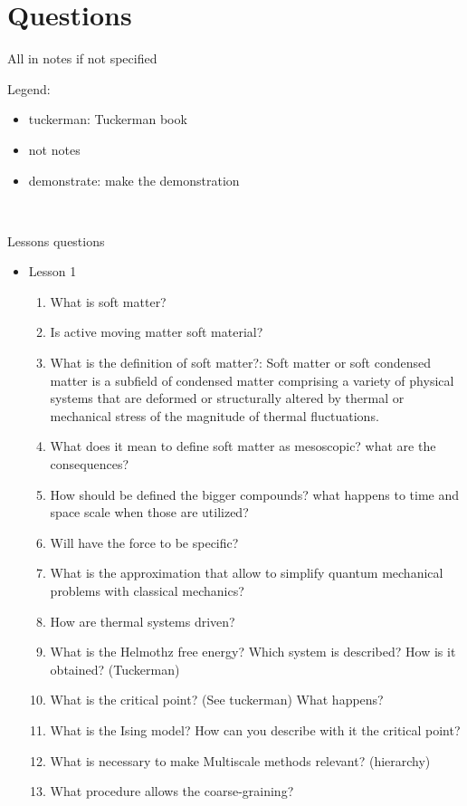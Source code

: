 \chapter{Questions}

All in notes if not specified\\
\small{
Legend:
\begin{itemize}
    \item tuckerman: Tuckerman book
    \item not notes
    \item demonstrate: make the demonstration
\end{itemize}
}
\hfill \\
\small{
Lessons questions
\begin{itemize}
    \item Lesson 1
    \begin{enumerate}
        \item What is soft matter?
        \item Is active moving matter soft material?
        \item What is the definition of soft matter?: Soft matter or soft condensed matter is a subfield of condensed matter comprising a variety of physical systems that are deformed or structurally altered by thermal or mechanical stress of the magnitude of thermal fluctuations.
        \item What does it mean to define soft matter as mesoscopic? what are the consequences?
        \item How should be defined the bigger compounds? what happens to time and space scale when those are utilized?
        \item Will have the force to be specific?
        \item What is the approximation that  allow to simplify quantum mechanical problems with classical mechanics?
        \item How are thermal systems driven?
        \item What is the Helmothz free energy? Which system is described? How is it obtained? (Tuckerman)
        \item What is the critical point? (See tuckerman) What happens?
        \item What is the Ising model? How can you describe with it the critical point?
        \item What is necessary to make Multiscale methods relevant? (hierarchy)
        \item What procedure allows the coarse-graining?

\end{enumerate}
\end{itemize}}
